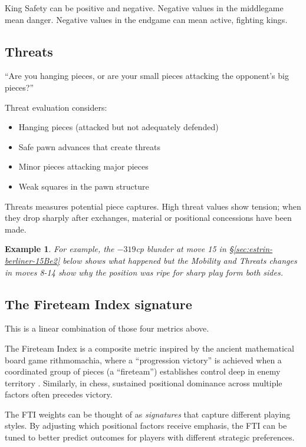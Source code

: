 \documentclass[12pt]{book}
\newtheorem{example}{Example}[section]
\begin{document}
King Safety can be positive and negative. Negative values in the middlegame mean danger. Negative values in the endgame can mean active, fighting kings.

\subsection{Threats}

``Are you hanging pieces, or are your small pieces attacking the opponent's big
pieces?''

Threat evaluation considers:
\begin{itemize}
\item Hanging pieces (attacked but not adequately defended)
\item Safe pawn advances that create threats
\item Minor pieces attacking major pieces
\item Weak squares in the pawn structure
\end{itemize}

Threats measures potential piece captures. High threat values show tension;
when they drop sharply after exchanges, material or positional concessions
have been made.


\begin{example}
For example, the $-319$cp blunder at move 15 in \S \ref{sec:estrin-berliner-15Be2}
below shows what happened but the Mobility and Threats changes in moves 8-14
show why the position was ripe for sharp play form both sides.
\end{example}

\subsection{The Fireteam Index signature}

This is a linear combination of those four metrics above.

The Fireteam Index is a composite metric inspired by the ancient mathematical
board game {rithmomachia}, where a ``progression victory'' is achieved when a
coordinated group of pieces (a ``fireteam'') establishes control deep in enemy
territory \cite{Ri25}. Similarly, in chess, sustained positional dominance
across multiple factors often precedes victory.

The FTI weights can be thought of as \emph{signatures} that capture different
playing styles. By adjusting which positional factors receive emphasis,
the FTI can be tuned to better predict outcomes for players with different strategic preferences.
\end{document}
